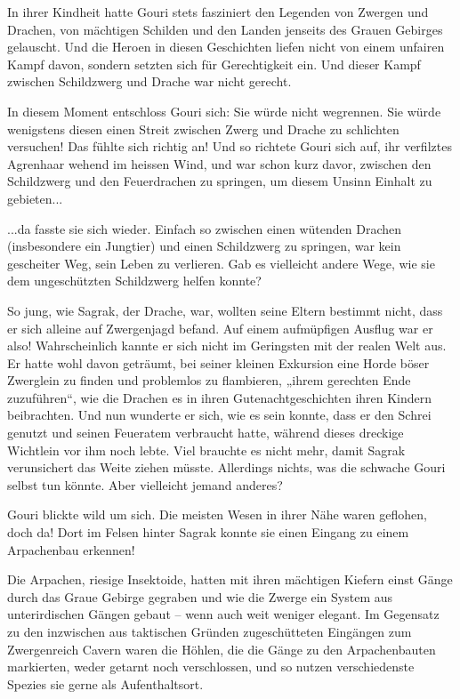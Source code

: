 In ihrer Kindheit hatte Gouri stets fasziniert den Legenden von Zwergen und Drachen, von mächtigen Schilden und den Landen jenseits des Grauen Gebirges gelauscht. Und die Heroen in diesen Geschichten liefen nicht von einem unfairen Kampf davon, sondern setzten sich für Gerechtigkeit ein. Und dieser Kampf zwischen Schildzwerg und Drache war nicht gerecht.

In diesem Moment entschloss Gouri sich: Sie würde nicht wegrennen. Sie würde wenigstens diesen einen Streit zwischen Zwerg und Drache zu schlichten versuchen! Das fühlte sich richtig an! Und so richtete Gouri sich auf, ihr verfilztes Agrenhaar wehend im heissen Wind, und war schon kurz davor, zwischen den Schildzwerg und den Feuerdrachen zu springen, um diesem Unsinn Einhalt zu gebieten...

...da fasste sie sich wieder. Einfach so zwischen einen wütenden Drachen (insbesondere ein Jungtier) und einen Schildzwerg zu springen, war kein gescheiter Weg, sein Leben zu verlieren. Gab es vielleicht andere Wege, wie sie dem ungeschützten Schildzwerg helfen konnte?

So jung, wie Sagrak, der Drache, war, wollten seine Eltern bestimmt nicht, dass er sich alleine auf Zwergenjagd befand. Auf einem aufmüpfigen Ausflug war er also! Wahrscheinlich kannte er sich nicht im Geringsten mit der realen Welt aus. Er hatte wohl davon geträumt, bei seiner kleinen Exkursion eine Horde böser Zwerglein zu finden und problemlos zu flambieren, „ihrem gerechten Ende zuzuführen“, wie die Drachen es in ihren Gutenachtgeschichten ihren Kindern beibrachten. Und nun wunderte er sich, wie es sein konnte, dass er den Schrei genutzt und seinen Feueratem verbraucht hatte, während dieses dreckige Wichtlein vor ihm noch lebte. Viel brauchte es nicht mehr, damit Sagrak verunsichert das Weite ziehen müsste. Allerdings nichts, was die schwache Gouri selbst tun könnte. Aber vielleicht jemand anderes?

Gouri blickte wild um sich. Die meisten Wesen in ihrer Nähe waren geflohen, doch da! Dort im Felsen hinter Sagrak konnte sie einen Eingang zu einem Arpachenbau erkennen!

Die Arpachen, riesige Insektoide, hatten mit ihren mächtigen Kiefern einst Gänge durch das Graue Gebirge gegraben und wie die Zwerge ein System aus unterirdischen Gängen gebaut – wenn auch weit weniger elegant. Im Gegensatz zu den inzwischen aus taktischen Gründen zugeschütteten Eingängen zum Zwergenreich Cavern waren die Höhlen, die die Gänge zu den Arpachenbauten markierten, weder getarnt noch verschlossen, und so nutzen verschiedenste Spezies sie gerne als Aufenthaltsort.

